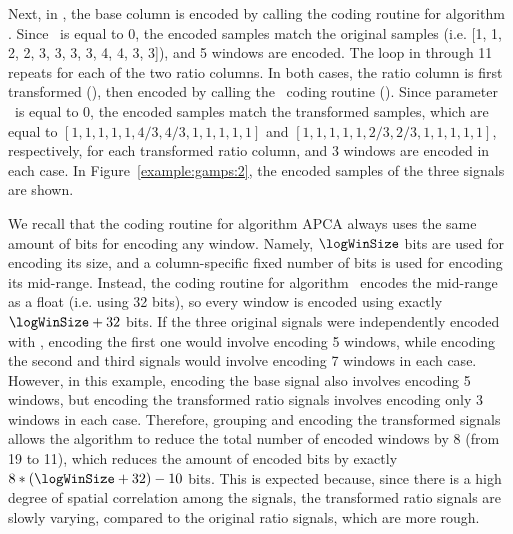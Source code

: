 Next, in , the base column is encoded by calling the coding routine for algorithm \apcaF. Since \epsilonB\ is equal to 0, the encoded samples match the original samples (i.e. [1, 1, 2, 2, 3, 3, 3, 3, 4, 4, 3, 3]), and 5 windows are encoded. The loop in  through 11 repeats for each of the two ratio columns. In both cases, the ratio column is first transformed (), then encoded by calling the \apcaF\ coding routine (). Since parameter \epsilonR\ is equal to 0, the encoded samples match the transformed samples, which are equal to $[1, 1, 1, 1, 1, 4/3, 4/3, 1, 1, 1, 1, 1]$ and $[1, 1, 1, 1, 1, 2/3, 2/3, 1, 1, 1, 1, 1]$, respectively, for each transformed ratio column, and 3 windows are encoded in each case. In Figure~\ref{example:gamps:2}, the encoded samples of the three signals are shown. 




We recall that the coding routine for algorithm APCA always uses the same amount of bits for encoding any window. Namely, $\logWinSize$ bits are used for encoding its size, and a column-specific fixed number of bits is used for encoding its mid-range. Instead, the coding routine for algorithm \apcaF\ encodes the mid-range as a float (i.e. using 32 bits), so every window is encoded using exactly $\logWinSize + 32$ bits. If the three original signals were independently encoded with \apcaF, encoding the first one would involve encoding 5 windows, while encoding the second and third signals would involve encoding 7 windows in each case. However, in this example, encoding the base signal also involves encoding 5 windows, but encoding the transformed ratio signals involves encoding only 3 windows in each case. Therefore, grouping and encoding the transformed signals allows the algorithm to reduce the total number of encoded windows by 8 (from 19 to 11), which reduces the amount of encoded bits by exactly $8*(\logWinSize + 32) - 10$ bits. This is expected because, since there is a high degree of spatial correlation among the signals, the transformed ratio signals are slowly varying, compared to the original ratio signals, which are more rough.


\clearpage





